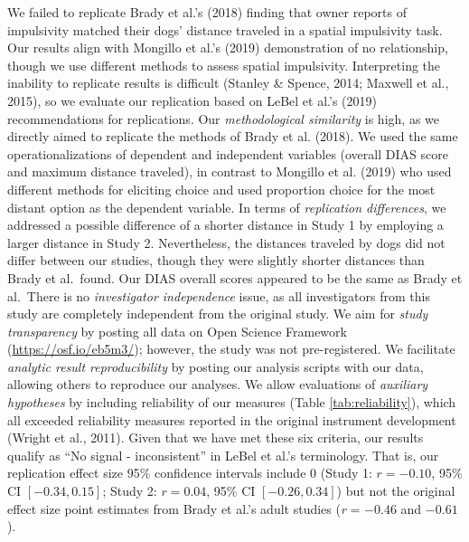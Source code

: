 \documentclass[
  pub,floatsintext]{apa6}
\begin{document}
We failed to replicate Brady et al.'s (2018) finding that owner reports of impulsivity matched their dogs' distance traveled in a spatial impulsivity task. Our results align with Mongillo et al.'s (2019) demonstration of no relationship, though we use different methods to assess spatial impulsivity. Interpreting the inability to replicate results is difficult (Stanley \& Spence, 2014; Maxwell et al., 2015), so we evaluate our replication based on LeBel et al.'s (2019) recommendations for replications. Our \emph{methodological similarity} is high, as we directly aimed to replicate the methods of Brady et al. (2018). We used the same operationalizations of dependent and independent variables (overall DIAS score and maximum distance traveled), in contrast to Mongillo et al. (2019) who used different methods for eliciting choice and used proportion choice for the most distant option as the dependent variable. In terms of \emph{replication differences}, we addressed a possible difference of a shorter distance in Study 1 by employing a larger distance in Study 2. Nevertheless, the distances traveled by dogs did not differ between our studies, though they were slightly shorter distances than Brady et al.~found. Our DIAS overall scores appeared to be the same as Brady et al.~There is no \emph{investigator independence} issue, as all investigators from this study are completely independent from the original study. We aim for \emph{study transparency} by posting all data on Open Science Framework (\url{https://osf.io/eb5m3/}); however, the study was not pre-registered. We facilitate \emph{analytic result reproducibility} by posting our analysis scripts with our data, allowing others to reproduce our analyses. We allow evaluations of \emph{auxiliary hypotheses} by including reliability of our measures (Table \ref{tab:reliability}), which all exceeded reliability measures reported in the original instrument development (Wright et al., 2011). Given that we have met these six criteria, our results qualify as ``No signal - inconsistent'' in LeBel et al.'s terminology. That is, our replication effect size 95\% confidence intervals include 0 (Study 1: \(r = -0.10\), 95\% CI \([-0.34, 0.15]\); Study 2: \(r = 0.04\), 95\% CI \([-0.26, 0.34]\)) but not the original effect size point estimates from Brady et al.'s adult studies (\emph{r} = \(-0.46\) and \(-0.61\)).
\end{document}
